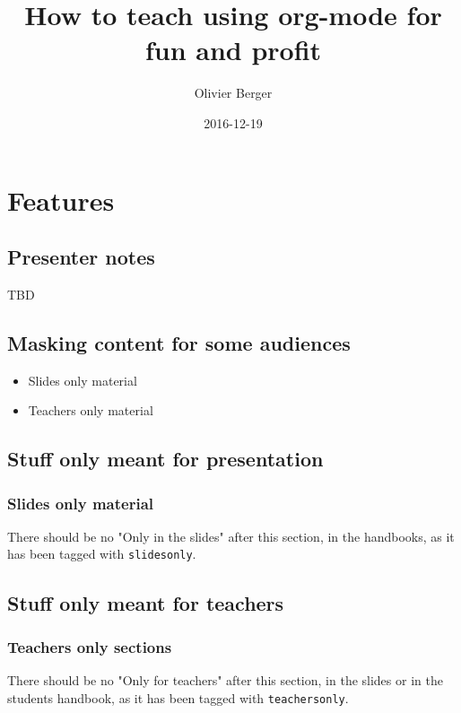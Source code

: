 \documentclass[a4paper]{article}
\author{Olivier Berger}
\date{2016-12-19}
\title{How to teach using org-mode for fun and profit}
\begin{document}
\setcounter{tocdepth}{1}
\tableofcontents





\section{Features}
\label{sec:orge09c7fe}
\subsection{Presenter notes}
\label{sec:org9691ccf}

TBD

\subsection{Masking content for some audiences}
\label{sec:orgf0ee536}

\begin{itemize}
\item Slides only material
\item Teachers only material
\end{itemize}

\subsection{Stuff only meant for presentation}
\label{sec:org4eb065b}

\subsubsection{Slides only material}
\label{sec:org0750a42}

There should be no "Only in the slides" after this section, in the
handbooks, as it has been tagged with \texttt{slidesonly}.

\subsection{Stuff only meant for teachers}
\label{sec:org8d35c81}

\subsubsection{Teachers only sections}
\label{sec:org1f00fea}

There should be no "Only for teachers" after this section, in the slides or in the
students handbook, as it has been tagged with \texttt{teachersonly}.
\end{document}
